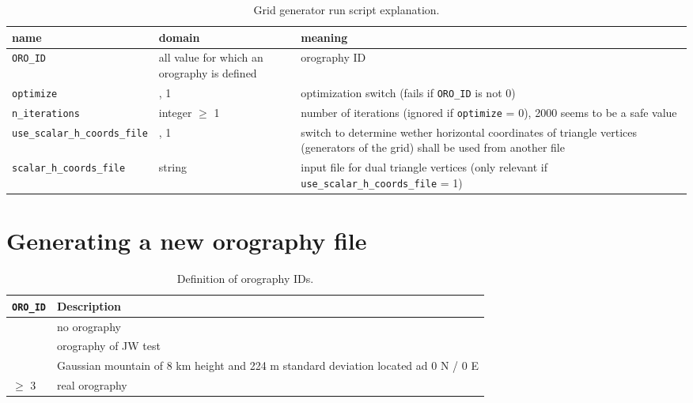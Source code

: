 \documentclass[10pt]{report}
\begin{document}
\renewcommand{\arraystretch}{1.2}
\begin{table}
\centering
\begin{tabular}{|>{\centering}p{5.0 cm}|>{\centering}p{3 cm}|>{\centering}p{7 cm}|}
\hline \textbf{name} & \textbf{domain} & \textbf{meaning} \tabularnewline
\hline\hline \texttt{\texttt{ORO\_ID}} & all value for which an orography is defined & orography ID \tabularnewline
\hline\hline \texttt{optimize} & 0, 1 & optimization switch (fails if \texttt{\texttt{ORO\_ID}} is not 0) \tabularnewline
\hline\hline \texttt{n\_iterations} & integer $\geq$ 1 & number of iterations (ignored if \texttt{optimize} = 0), 2000 seems to be a safe value \tabularnewline
\hline\hline \texttt{use\_scalar\_h\_coords\_file} & 0, 1 & switch to determine wether horizontal coordinates of triangle vertices (generators of the grid) shall be used from another file \tabularnewline
\hline\hline \texttt{scalar\_h\_coords\_file} & string & input file for dual triangle vertices (only relevant if \texttt{use\_scalar\_h\_coords\_file} = 1) \tabularnewline
\hline
\end{tabular}
\caption{Grid generator run script explanation.}
\label{tab:grid_generator_run_file_explanation}
\end{table}
\renewcommand{\arraystretch}{1}

\chapter{Generating a new orography file}
\label{chap:generating_a_new_orography_file}

\renewcommand{\arraystretch}{1.2}
\begin{table}
\centering
\begin{tabular}{|>{\centering}p{4.0 cm}|>{\centering}p{8 cm}|}
\hline \textbf{\texttt{ORO\_ID}} & \textbf{Description} \tabularnewline
\hline\hline 0 & no orography \tabularnewline
\hline 1 & orography of JW test \tabularnewline
\hline 2 & Gaussian mountain of 8 km height and 224 m standard deviation located ad 0 N / 0 E\tabularnewline
\hline $\geq$ 3 & real orography \tabularnewline
\hline
\end{tabular}
\caption{Definition of orography IDs.}
\label{tab:oro_id_definition}
\end{table}
\renewcommand{\arraystretch}{1}
\end{document}
